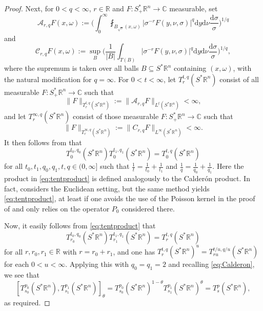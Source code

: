 \documentclass{amsart}
\newcommand {\A}{{\mathcal{A}}}
\newcommand {\C}{{\mathbb C}}
\newcommand {\ud}{\mathrm{d}}
\newcommand {\R}{\mathbb R}
\newcommand {\Rn}{\mathbb{R}^{n}}
\newcommand {\Sp}{S^{*}\Rn}
\newcommand {\Spp}{S^{*}_{+}\Rn}
\newcommand {\w}{\omega}
\theoremstyle{definition}
\numberwithin{equation}{section}
\begin{document}
\begin{proof}
Next, for $0<q<\infty$, $r\in\R$ and $F:\Spp\to\C$ measurable, set 
\[
\A_{r,q} F(x,\w):=\Big(\int_{0}^{\infty}\fint_{B_{\sqrt{\sigma}}(x,\w)}|{\sigma}^{-r}F(y,\nu,\sigma)|^{q}\ud y\ud \nu\frac{\ud \sigma}{\sigma}\Big)^{1/q}
\]
and
\[
\mathcal{C}_{r,q}F(x,\w):=\sup_{B}\Big(\frac{1}{|B|}\int_{T(B)}|\sigma^{-r}F(y,\nu,\sigma)|^{q}\ud y\ud \nu\frac{\ud \sigma}{\sigma}\Big)^{1/q},
\]
where the supremum is taken over all balls $B\subseteq \Sp$ containing $(x,\w)$, with the natural modification for $q=\infty$. 
For $0<t<\infty$, let $T^{t,q}_{r}(\Sp)$ consist of all measurable $F:\Spp\to\C$ such that 
\[
\|F\|_{T^{t,q}_{r}(\Sp)}:=\|\A_{r,q}F\|_{L^{t}(\Sp)}<\infty,
\]
and let $T^{\infty,q}_{r}(\Sp)$ consist of those measurable $F:\Spp\to\C$ such that
\[
\|F\|_{T^{\infty,q}_{r}(\Sp)}:=\|C_{r,q}F\|_{L^{\infty}(\Sp)}<\infty.
\]
It then follows from \cite{Cohn-Verbitsky00} that 
\begin{equation}\label{eq:tentproduct}
T^{t_{0},q_{0}}_{0}(\Sp)T^{t_{1},q_{1}}_{0}(\Sp)=T^{t,q}_{0}(\Sp)
\end{equation}
for all $t_{0},t_{1},q_{0},q_{1},t,q\in(0,\infty]$ such that $\frac{1}{t}=\frac{1}{t_{0}}+\frac{1}{t_{1}}$ and $\frac{1}{q}=\frac{1}{q_{0}}+\frac{1}{q_{1}}$. Here the product in \eqref{eq:tentproduct} is defined analogously to the Calder\'{o}n product. In fact, \cite{Cohn-Verbitsky00} considers the Euclidean setting, but the same method yields \eqref{eq:tentproduct}, at least if one avoids the use of the Poisson kernel in the proof of \cite[Lemma 2.1]{Cohn-Verbitsky00} and only relies on the operator $P_{0}$ considered there.

Now, it easily follows from \eqref{eq:tentproduct} that
\[
T^{t_{0},q_{0}}_{r_{0}}(\Sp)T^{t_{1},q_{1}}_{r_{1}}(\Sp)=T^{t,q}_{r}(\Sp)
\]
for all $r,r_{0},r_{1}\in\R$ with $r=r_{0}+r_{1}$, and one has $T^{t,q}_{r}(\Sp)^{u}=T^{t/u,q/u}_{ru}(\Sp)$ for each $0<u<\infty$. Applying this with $q_{0}=q_{1}=2$ and recalling \eqref{eq:Calderon}, we see that
\[
[T^{p_{0}}_{s_{0}}(\Sp),T^{p_{1}}_{s_{1}}(\Sp)]_{\theta}=T^{p_{0}}_{s_{0}}(\Sp)^{1-\theta}T^{p_{1}}_{s_{1}}(\Sp)^{\theta}=T^{p}_{s}(\Sp),
\] 
as required.
\end{proof}






\end{document}

